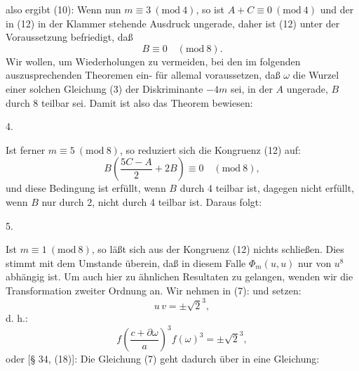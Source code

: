 
also ergibt (10):
Wenn nun $m \equiv 3\ (\mathrm{mod}\ 4)$, so ist $A + C \equiv 0\ (\mathrm{mod}\ 4)$ und der in (12) in der Klammer stehende Ausdruck ungerade, daher ist (12)  unter der Voraussetzung befriedigt, daß
\[
B \equiv 0 \quad (\mathrm{mod}\ 8).
\]
Wir wollen, um Wiederholungen zu vermeiden, bei den im folgenden auszusprechenden Theoremen ein- für allemal voraussetzen, daß $\omega$ die Wurzel einer solchen Gleichung (3) der Diskriminante $-4m$ sei, in der $A$ ungerade, $B$ durch 8 teilbar sei. Damit ist also das Theorem bewiesen:

4. 

Ist ferner $m \equiv 5\ (\mathrm{mod}\ 8)$, so reduziert sich die Kongruenz (12) auf:
\[
B\left(\frac{5C - A}{2} + 2B\right) \equiv 0 \quad (\mathrm{mod}\ 8),
\]
und diese Bedingung ist erfüllt, wenn $B$ durch 4 teilbar ist, dagegen nicht erfüllt, wenn $B$ nur durch 2, nicht durch 4 teilbar ist. Daraus folgt:

5. 

Ist $m \equiv 1\ (\mathrm{mod}\ 8)$, so läßt sich aus der Kongruenz (12) nichts schließen. Dies stimmt mit dem Umstande überein, daß in diesem Falle $\Phi_m(u, u)$ nur von $u^8$ abhängig ist. Um auch hier zu ähnlichen Resultaten zu gelangen, wenden wir die Transformation zweiter Ordnung an. Wir nehmen in (7):
und setzen:
\[
u\,v = \pm \sqrt{2}^{3},
\]
d. h.:
\[
f\left(\frac{c + \partial\omega}{a}\right)^{3} f(\omega)^{3} = \pm \sqrt{2}^{3},
\]
oder [§ 34, (18)]:
Die Gleichung (7) geht dadurch über in eine Gleichung:
